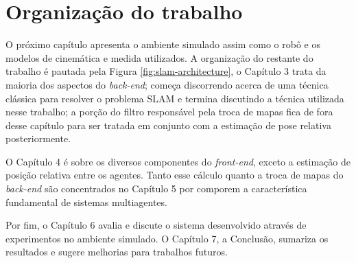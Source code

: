\section{Organização do trabalho}
O próximo capítulo apresenta o ambiente simulado assim como o robô e os 
modelos de cinemática e medida utilizados. A organização do restante do 
trabalho é pautada pela Figura \ref{fig:slam-architecture}, o Capítulo 
3 trata da maioria dos aspectos do \textit{back-end}; começa discorrendo acerca de uma técnica clássica para resolver o problema SLAM e termina discutindo a técnica utilizada nesse trabalho; a porção do filtro responsável pela troca de mapas fica de fora desse capítulo para ser 
tratada em conjunto com a estimação de pose relativa posteriormente.

O Capítulo 4 é sobre os diversos componentes do \textit{front-end}, exceto 
a estimação de posição relativa entre os agentes. Tanto esse cálculo 
quanto a troca de mapas do \textit{back-end} são concentrados no 
Capítulo 5 por comporem a característica fundamental de 
sistemas multiagentes.

Por fim, o Capítulo 6 avalia e discute o sistema desenvolvido através de 
experimentos no ambiente simulado. O Capítulo 7, a Conclusão, sumariza 
os resultados e sugere melhorias para trabalhos futuros.